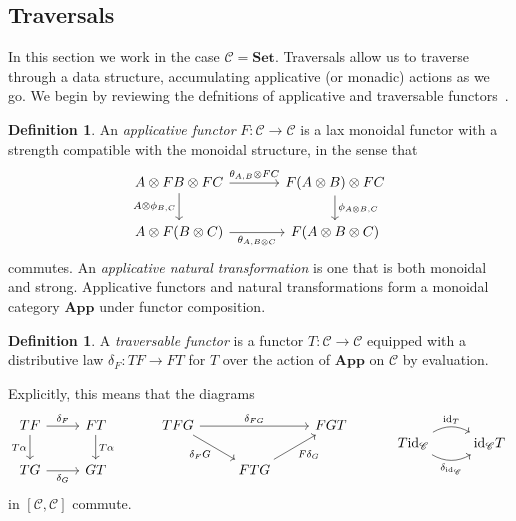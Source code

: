\documentclass[11pt,letterpaper]{article}
\theoremstyle{plain}
\theoremstyle{definition}
\newtheorem{definition}[theorem]{Definition}
\newcommand{\C}{\mathscr{C}}
\newcommand{\Set}{\mathbf{Set}}
\newcommand{\App}{\mathbf{App}}
\newcommand{\id}{\mathrm{id}}
\begin{document}
\subsection{Traversals}
In this section we work in the case $\C = \Set$. Traversals allow us to traverse through a data structure, accumulating applicative (or monadic) actions as we go. We begin by reviewing the defnitions of applicative and traversable functors~\cite{AnInvestigationOfTheLawsOfTraversals}.

\begin{definition}
An \emph{applicative functor} $F : \C \to \C$ is a lax monoidal functor with a strength compatible with the monoidal structure, in the sense that
\[
\begin{tikzcd}[column sep = large]
A \otimes FB \otimes FC \ar[r, "{\theta_{A, B} \otimes FC}"] \ar[d, swap, "{A \otimes \phi_{B, C}}"] & F(A \otimes B) \otimes FC \ar[d, "{\phi_{A \otimes B, C}}"] \\
A \otimes F(B \otimes C) \ar[r, swap, "{\theta_{A, B \otimes C}}"] & F(A \otimes B \otimes C)
\end{tikzcd}
\]
commutes. An \emph{applicative natural transformation} is one that is both monoidal and strong. Applicative functors and natural transformations form a monoidal category $\App$ under functor composition.
\end{definition}

\begin{definition}
A \emph{traversable functor} is a functor $T : \C \to \C$ equipped with a distributive law $\delta_F : TF \to FT$ for $T$ over the action of $\App$ on $\C$ by evaluation.

Explicitly, this means that the diagrams
\[
  \begin{tikzcd}
    TF \ar[r, "\delta_F"] \ar[d, swap, "T\alpha"] & FT \ar[d, "T\alpha"] \\
    TG \ar[r, swap, "\delta_G"] & GT
  \end{tikzcd} \hspace{1cm}
  \begin{tikzcd}
    TFG \ar[dr, swap, "\delta_F G"] \ar[rr, "\delta_{FG}"] &  & FGT \\
    & FTG \ar[ur, swap, "F \delta_G"] &
  \end{tikzcd} \hspace{1cm}
  \begin{tikzcd}
    T\id_\C \ar[r, bend left, "\id_T"] \ar[r, bend right, swap, "\delta_{\id_\C}"] & \id_\C T
  \end{tikzcd}
\]
in $[\C, \C]$ commute.
\end{definition}
\end{document}
